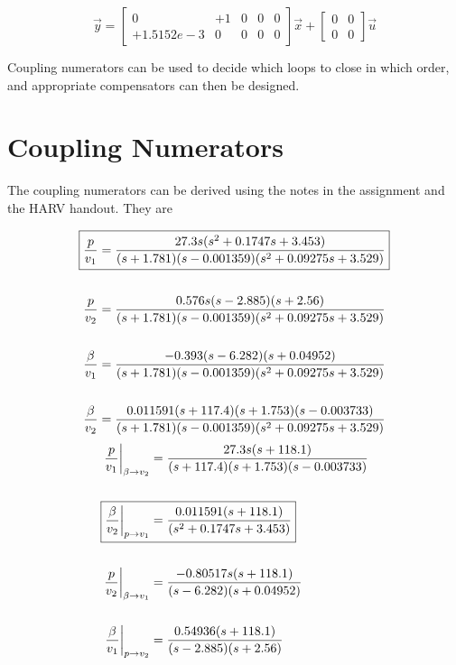\documentclass[11pt]{article}
\begin{document}
$$
\vec{y} = \left[ \begin{array}{ccccc}
           0 &         +1 &           0 &           0 &           0 \\
  +1.5152e-3 &          0 &           0 &           0 &           0 \end{array} \right]
\vec{x}+\left[\begin{array}{ccc}
         0 &         0 \\
         0 &         0 \end{array}\right]\vec{u}
$$

\noindent Coupling numerators can be used to decide which loops to close in which order, and appropriate compensators can then be designed.

\clearpage
\section{Coupling Numerators}

The coupling numerators can be derived using the notes in the assignment and the HARV handout. They are

\begin{gather*}
\begin{split}
\Aboxed{\dfrac{p}{v_1} & =\dfrac{27.3 s (s^2 + 0.1747s + 3.453)} {(s+1.781) (s-0.001359) (s^2 + 0.09275s + 3.529)}} \\
\\
\dfrac{p}{v_2} & =\dfrac{0.576 s (s-2.885) (s+2.56)}
                      {(s+1.781) (s-0.001359) (s^2 + 0.09275s + 3.529)} \\
\\
\dfrac{\beta}{v_1} & =\dfrac{-0.393 (s-6.282) (s+0.04952)}
                          {(s+1.781) (s-0.001359) (s^2 + 0.09275s + 3.529)} \\
\\
\dfrac{\beta}{v_2} & =\dfrac{0.011591 (s+117.4) (s+1.753) (s-0.003733)}
                          {(s+1.781) (s-0.001359) (s^2 + 0.09275s + 3.529)} \\
\end{split}
\end{gather*}
\begin{gather*}
\begin{split}
\dfrac{p}{v_1}\biggr\rvert_{\beta \rightarrow v_2}
             & = \dfrac{27.3 s (s+118.1)}{(s+117.4) (s+1.753) (s-0.003733)} \\
\\
\Aboxed{\dfrac{\beta}{v_2}\biggr\rvert_{p \rightarrow v_1}
             & = \dfrac{0.011591 (s+118.1)}{(s^2 + 0.1747s + 3.453)}} \\
\\
\dfrac{p}{v_2}\biggr\rvert_{\beta \rightarrow v_1}
             & = \dfrac{-0.80517 s (s+118.1)}{(s-6.282) (s+0.04952)} \\
\\
\dfrac{\beta}{v_1}\biggr\rvert_{p \rightarrow v_2}
             & = \dfrac{0.54936 (s+118.1)}{(s-2.885) (s+2.56)} \\
\end{split}
\end{gather*}
\end{document}
